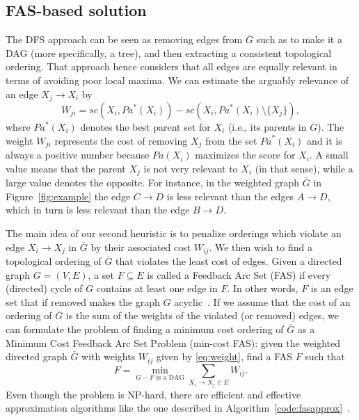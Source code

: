 \subsection{FAS-based solution}
\label{subsec:fasapproach}
The DFS approach can be seen as removing edges from $\overline G$ such as to make it a DAG (more specifically, a tree), and then extracting a consistent topological ordering. That approach hence considers that all edges are equally relevant in terms of avoiding poor local maxima. We can estimate the arguably relevance of an edge $X_j \rightarrow X_i$ by
\begin{equation}
  \label{eq:weight}
  W_{ji} = {sc}( X_i , {Pa}^*( X_i ) ) - {sc}( X_i , {Pa}^*( X_i ) \setminus \{ X_j \} ) ,
\end{equation}
where ${Pa}^*( X_i )$ denotes the best parent set for $X_i$ (i.e., its parents in $\overline G$). The weight $W_{ji}$ represents the cost of removing $X_j$ from the set ${Pa}^*( X_i )$ and it is always a positive number because ${Pa}( X_i )$ maximizes the score for $X_i$. A small value means that the parent $X_j$ is not very relevant to $X_i$ (in that sense), while a large value denotes the opposite. For instance, in the weighted graph $\overline G$ in Figure~\ref{fig:example} the edge $C \rightarrow D$ is less relevant than the edges $A \rightarrow D$, which in turn is less relevant than the edge $B  \rightarrow D$. 

   The main idea of our second heuristic is to penalize orderings which violate an edge $X_i \rightarrow X_j$ in $\overline G$ by their associated cost $W_{ij}$. We then wish to find a topological ordering of $\overline G$ that violates the least cost of edges. Given a directed graph $G = (V,E)$, a set $F \subseteq E$ is called a Feedback Arc Set (FAS) if every (directed) cycle of $G$ contains at least one edge in $F$. In other words, $F$ is an edge set that if removed makes the graph $G$ acyclic~\cite{DF01}. If we assume that the cost of an ordering of $\overline G$ is the sum of the weights of the violated (or removed) edges, we can formulate the problem of finding a minimum cost ordering of $\overline G$ as a Minimum Cost Feedback Arc Set Problem (min-cost FAS): given the weighted directed graph $\overline{G}$ with weights $W_{ij}$ given by \eqref{eq:weight}, find a FAS $F$ such that
\begin{equation}
  \label{eq:mincostfas}
  F = \min_{G - F \text{ is a DAG}} \sum_{X_i \rightarrow X_j \in E} W_{ij} .
\end{equation}
Even though the problem is NP-hard, there are efficient and effective approximation algorithms like the one described in Algorithm~\ref{code:fasapprox}~\cite{DF01}.

